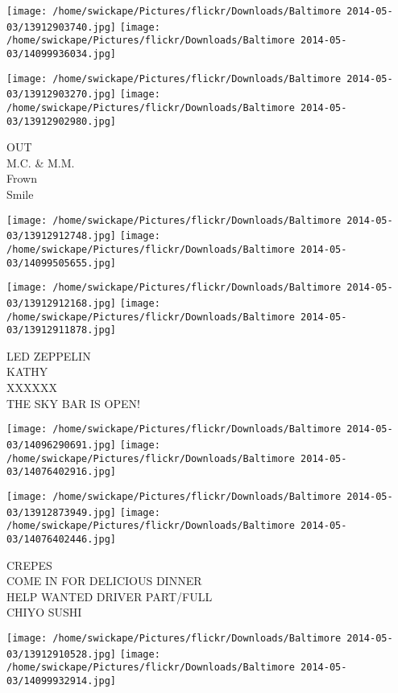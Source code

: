 \documentclass[10pt,letterpaper]{article}
\begin{document}
\texttt{[image: /home/swickape/Pictures/flickr/Downloads/Baltimore 2014-05-03/13912903740.jpg]}
\texttt{[image: /home/swickape/Pictures/flickr/Downloads/Baltimore 2014-05-03/14099936034.jpg]}

\texttt{[image: /home/swickape/Pictures/flickr/Downloads/Baltimore 2014-05-03/13912903270.jpg]}
\texttt{[image: /home/swickape/Pictures/flickr/Downloads/Baltimore 2014-05-03/13912902980.jpg]}

OUT\\
M.C. \& M.M.\\
Frown\\
Smile\\
\pagebreak

\texttt{[image: /home/swickape/Pictures/flickr/Downloads/Baltimore 2014-05-03/13912912748.jpg]}
\texttt{[image: /home/swickape/Pictures/flickr/Downloads/Baltimore 2014-05-03/14099505655.jpg]}

\texttt{[image: /home/swickape/Pictures/flickr/Downloads/Baltimore 2014-05-03/13912912168.jpg]}
\texttt{[image: /home/swickape/Pictures/flickr/Downloads/Baltimore 2014-05-03/13912911878.jpg]}

LED ZEPPELIN\\
KATHY\\
XXXXXX\\
THE SKY BAR IS OPEN!\\
\pagebreak

\texttt{[image: /home/swickape/Pictures/flickr/Downloads/Baltimore 2014-05-03/14096290691.jpg]}
\texttt{[image: /home/swickape/Pictures/flickr/Downloads/Baltimore 2014-05-03/14076402916.jpg]}

\texttt{[image: /home/swickape/Pictures/flickr/Downloads/Baltimore 2014-05-03/13912873949.jpg]}
\texttt{[image: /home/swickape/Pictures/flickr/Downloads/Baltimore 2014-05-03/14076402446.jpg]}

CREPES\\
COME IN FOR DELICIOUS DINNER\\
HELP WANTED DRIVER PART/FULL\\
CHIYO SUSHI\\
\pagebreak

\texttt{[image: /home/swickape/Pictures/flickr/Downloads/Baltimore 2014-05-03/13912910528.jpg]}
\texttt{[image: /home/swickape/Pictures/flickr/Downloads/Baltimore 2014-05-03/14099932914.jpg]}
\end{document}
